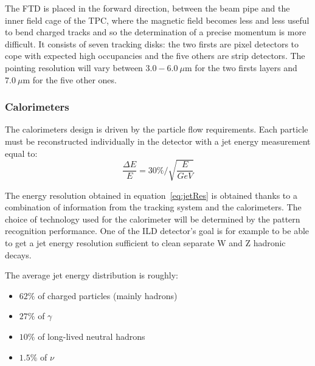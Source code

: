      The \gls{FTD} is placed in the forward direction, between the beam pipe and the inner field cage of the \gls{TPC}, where the magnetic field becomes less and less useful to bend charged tracks and so the determination of a precise momentum is more difficult.
     It consists of seven tracking disks: the two firsts are pixel detectors to cope with expected high occupancies and the five others are strip detectors.
     The pointing resolution will vary between $3.0-6.0 \ \mu$m for the two firsts layers and $7.0 \ \mu$m for the five other ones.
     


      \subsubsection{Calorimeters}

      The calorimeters design is driven by the particle flow requirements.
      Each particle must be reconstructed individually in the detector with a jet energy measurement equal to:
      \begin{equation}
        \frac{\Delta E}{E} = 30 \% / \sqrt{\frac{E}{GeV}}
        \label{eq:jetRes}
      \end{equation}

      The energy resolution obtained in equation~\ref{eq:jetRes} is obtained thanks to a combination of information from the tracking system and the calorimeters. 
      The choice of technology used for the calorimeter will be determined by the pattern recognition performance. 
      One of the \gls{ILD} detector's goal is for example to be able to get a jet energy resolution sufficient to clean separate W and Z hadronic decays.
      
      The average jet energy distribution is roughly: 
      \begin{itemize}
        \item $62 \%$ of charged particles (mainly hadrons)
        \item $27 \%$ of $\gamma$
        \item $10 \%$ of long-lived neutral hadrons
        \item $1.5 \%$ of $\nu$
      \end{itemize}

